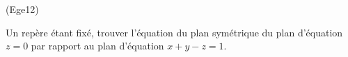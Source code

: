 \begin{tiny}(Ege12)\end{tiny} Un repère étant fixé, trouver l'équation du plan symétrique du plan d'équation $z=0$ par rapport au plan d'équation $x+y-z=1$. 